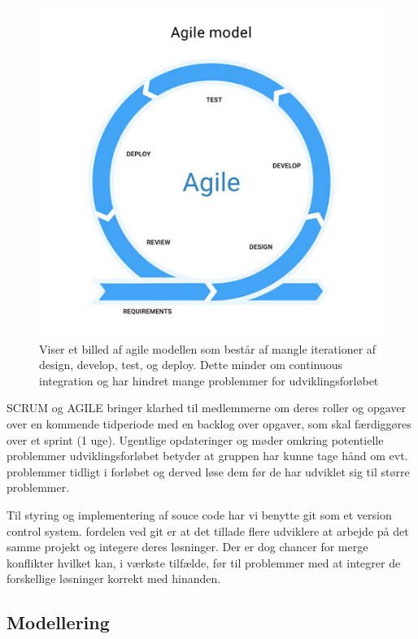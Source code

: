 \begin{figure}[H]
  \centering
  \includegraphics[scale=.5]{02-Body/Images/Agile.png}
  \caption{Viser et billed af agile modellen som består af mangle iterationer
           af design, develop, test, og deploy. Dette minder om continuous integration
           og har hindret mange problemmer for udviklingsforløbet}
  \label{fig:Agile}
\end{figure}

SCRUM og AGILE bringer klarhed til medlemmerne om deres roller og opgaver over en 
kommende tidperiode med en backlog over opgaver, som skal færdiggøres over et sprint (1 uge).
Ugentlige opdateringer og møder omkring potentielle problemmer udviklingsforløbet betyder
at gruppen har kunne tage hånd om evt. problemmer tidligt i forløbet og derved løse dem
før de har udviklet sig til større problemmer.

Til styring og implementering af souce code har vi benytte git som et version control system.
fordelen ved git er at det tillade flere udviklere at arbejde på det samme projekt og integere 
deres løsninger. Der er dog chancer for merge konflikter hvilket kan, i værkste tilfælde, før
til problemmer med at integrer de forskellige løsninger korrekt med hinanden.

\subsection{Modellering}

